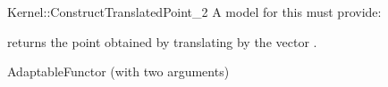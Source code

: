\begin{ccRefFunctionObjectConcept}{Kernel::ConstructTranslatedPoint_2}
A model for this must provide:


       {returns the point obtained by translating  by the vector 
        .}

\ccRefines
AdaptableFunctor (with two arguments)

\ccSeeAlso
{}\\

\end{ccRefFunctionObjectConcept}

